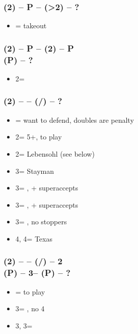 \documentclass[12pt, a4paper]{article}
\begin{document}
\subsubsection*{(2\diams) -- P -- (>2\spades) -- ?}
\begin{itemize}
    \item \dbl = takeout \imp
\end{itemize}

\subsubsection*{(2\diams) -- P -- (2\hearts) -- P \\
                (P) -- ?}        
\begin{itemize}
    \item 2\nt = \minor
\end{itemize}

\subsubsection*{(2\diams) -- \dbl -- (\rdbl/\pass) -- ?}        
\begin{itemize}
    \item \pass = want to defend, doubles are penalty
    \item 2\major = 5+\major, to play
    \item 2\nt = Lebensohl (see below)
    \item 3\clubs = Stayman \vimp
    \item 3\diams = \trsf{\hearts}, \gf + superaccepts
    \item 3\hearts = \trsf{\spades}, \gf + superaccepts
    \item 3\spades = \trsf{\nt}, no \major stoppers
    \item 4\diams, 4\hearts = Texas
\end{itemize}

\subsubsection*{(2\diams) -- \dbl -- (\rdbl/\pass) -- 2\nt \\
                (P) -- 3\clubs -- (P) -- ?}        
\begin{itemize}
    \item \pass = to play
    \item 3\diams = \gf, no 4\majs \vimp
    \item 3\hearts, 3\spades = \inv
\end{itemize}
\end{document}
